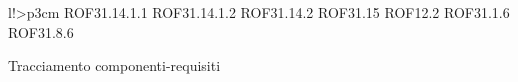 \begin{tabella}{l!{\VRule}>{\centering\arraybackslash}p{3cm}}
\linebreak ROF31.14.1.1 \linebreak ROF31.14.1.2 \linebreak ROF31.14.2 \linebreak ROF31.15 \linebreak ROF12.2 \linebreak ROF31.1.6 \linebreak ROF31.8.6 \\
\caption{Tracciamento componenti-requisiti}
\end{tabella}
